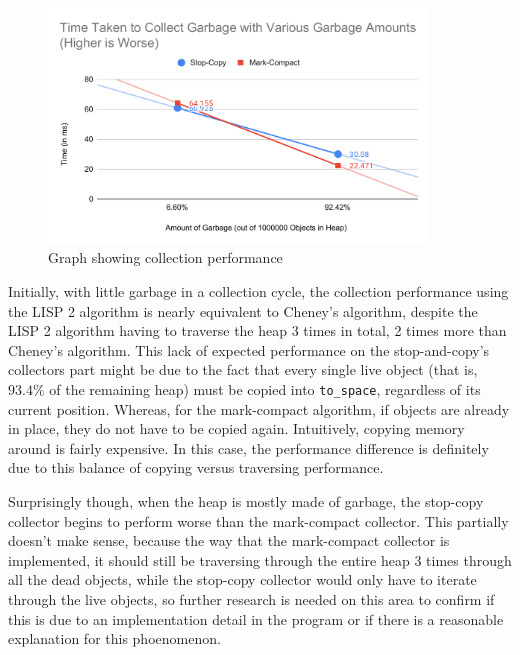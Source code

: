 \documentclass[index]{subfiles}
\begin{document}
\begin{figure}[H]
    \centering
    \includegraphics[width=0.9\textwidth]{pics/collect-perf.pdf}
    \caption{Graph showing collection performance}
\end{figure}

Initially, with little garbage in a collection cycle, the collection performance using the LISP 2 algorithm is nearly equivalent to Cheney's algorithm, despite the LISP 2 algorithm having to traverse the heap 3 times in total, 2 times more than Cheney's algorithm. This lack of expected performance on the stop-and-copy's collectors part might be due to the fact that every single live object (that is, \(93.4\%\) of the remaining heap) must be copied into \verb+to_space+, regardless of its current position. Whereas, for the mark-compact algorithm, if objects are already in place, they do not have to be copied again. Intuitively, copying memory around is fairly expensive. In this case, the performance difference is definitely due to this balance of copying versus traversing performance. 

Surprisingly though, when the heap is mostly made of garbage, the stop-copy collector begins to perform worse than the mark-compact collector. This partially doesn't make sense, because the way that the mark-compact collector is implemented, it should still be traversing through the entire heap 3 times through all the dead objects, while the stop-copy collector would only have to iterate through the live objects, so further research is needed on this area to confirm if this is due to an implementation detail in the program or if there is a reasonable explanation for this phoenomenon.
\end{document}
